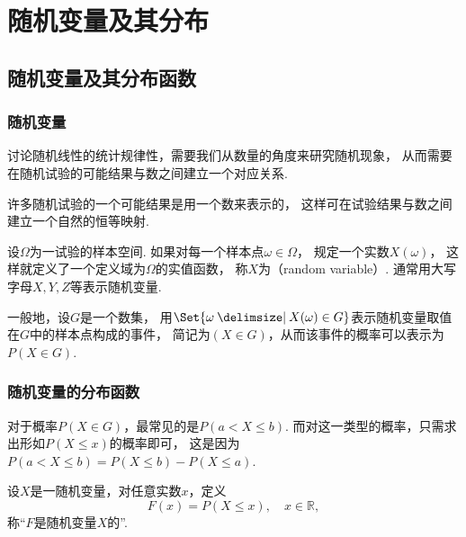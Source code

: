 \chapter{随机变量及其分布}
\section{随机变量及其分布函数}
\subsection{随机变量}
讨论随机线性的统计规律性，需要我们从数量的角度来研究随机现象，
从而需要在随机试验的可能结果与数之间建立一个对应关系.

许多随机试验的一个可能结果是用一个数来表示的，
这样可在试验结果与数之间建立一个自然的恒等映射.

\begin{definition}
设\(\Omega\)为一试验的样本空间.
如果对每一个样本点\(\omega \in \Omega\)，
规定一个实数\(X(\omega)\)，
这样就定义了一个定义域为\(\Omega\)的实值函数，
称\(X\)为（random variable）.
通常用大写字母\(X,Y,Z\)等表示随机变量.

一般地，设\(G\)是一个数集，
用\(\Set{\omega \given X(\omega) \in G}\)表示随机变量取值在\(G\)中的样本点构成的事件，
简记为\((X \in G)\)，从而该事件的概率可以表示为\(P(X \in G)\).
\end{definition}

\subsection{随机变量的分布函数}
对于概率\(P(X \in G)\)，最常见的是\(P(a < X \leq b)\).
而对这一类型的概率，只需求出形如\(P(X \leq x)\)的概率即可，
这是因为\(P(a < X \leq b) = P(X \leq b) - P(X \leq a)\).

\begin{definition}
设\(X\)是一随机变量，对任意实数\(x\)，定义\[
	F(x) = P(X \leq x),
	\quad x \in \mathbb{R},
\]
称“\(F\)是随机变量\(X\)的”.
\end{definition}

